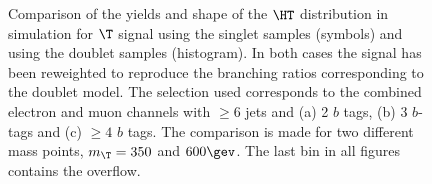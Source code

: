 \begin{figure}[htbp]
\begin{center}
\caption{
Comparison of the yields and shape of the $\HT$ distribution in simulation for $\T$ signal using the singlet samples (symbols) and
using the doublet samples (histogram). In both cases the signal has been reweighted to reproduce the branching ratios corresponding 
to the doublet model. The selection used corresponds to the combined electron and muon channels
with $\geq 6$ jets and (a) 2 $b$ tags,  (b) 3 $b$-tags and (c) $\geq 4$ $b$ tags. The comparison is made for two 
different mass points, $m_{\T}=350$ and $600\gev$.
The last bin in all figures contains the overflow.
\label{fig:HT_checks_SingletvsDoubletComp}}
\end{center}
\end{figure}
